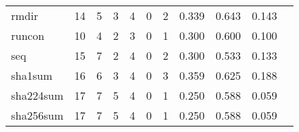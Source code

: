 \begin{longtable}{lp{1.2cm}p{1.2cm}p{1.2cm}p{1.2cm}p{1.2cm}p{1.2cm}p{1.2cm}p{1.2cm}p{1.2cm}p{1.2cm}}
rmdir     &                                    14 &                                                  5 &                                                  3 &                                                  4 &                                                  0 &                                                  2 &                                              0.339 &                                              0.643 &                                              0.143 \\
runcon    &                                    10 &                                                  4 &                                                  2 &                                                  3 &                                                  0 &                                                  1 &                                              0.300 &                                              0.600 &                                              0.100 \\
seq       &                                    15 &                                                  7 &                                                  2 &                                                  4 &                                                  0 &                                                  2 &                                              0.300 &                                              0.533 &                                              0.133 \\
sha1sum   &                                    16 &                                                  6 &                                                  3 &                                                  4 &                                                  0 &                                                  3 &                                              0.359 &                                              0.625 &                                              0.188 \\
sha224sum &                                    17 &                                                  7 &                                                  5 &                                                  4 &                                                  0 &                                                  1 &                                              0.250 &                                              0.588 &                                              0.059 \\
sha256sum &                                    17 &                                                  7 &                                                  5 &                                                  4 &                                                  0 &                                                  1 &                                              0.250 &                                              0.588 &                                              0.059 \\

\end{longtable}
